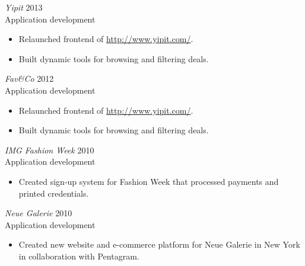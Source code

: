\documentclass[line,margin]{res}
\begin{document}
\begin{resume}
    {\sl Yipit}
    \hfill 2013 \\
    Application development
    \begin{itemize} \itemsep -2pt
        \item
            Relaunched frontend of \url{http://www.yipit.com/}.
        \item
            Built dynamic tools for browsing and filtering deals.
    \end{itemize}

    {\sl Fav\&Co}
    \hfill 2012 \\
    Application development
    \begin{itemize} \itemsep -2pt
        \item
            Relaunched frontend of \url{http://www.yipit.com/}.
        \item
            Built dynamic tools for browsing and filtering deals.
    \end{itemize}

    {\sl IMG Fashion Week}
    \hfill 2010 \\
    Application development
    \begin{itemize} \itemsep -2pt
        \item
            Created sign-up system for Fashion Week that processed payments
            and printed credentials.
    \end{itemize}

    {\sl Neue Galerie}
    \hfill 2010 \\
    Application development
    \begin{itemize} \itemsep -2pt
        \item
            Created new website and e-commerce platform for Neue Galerie in New York
            in collaboration with Pentagram.
    \end{itemize}

\end{resume}
\end{document}
